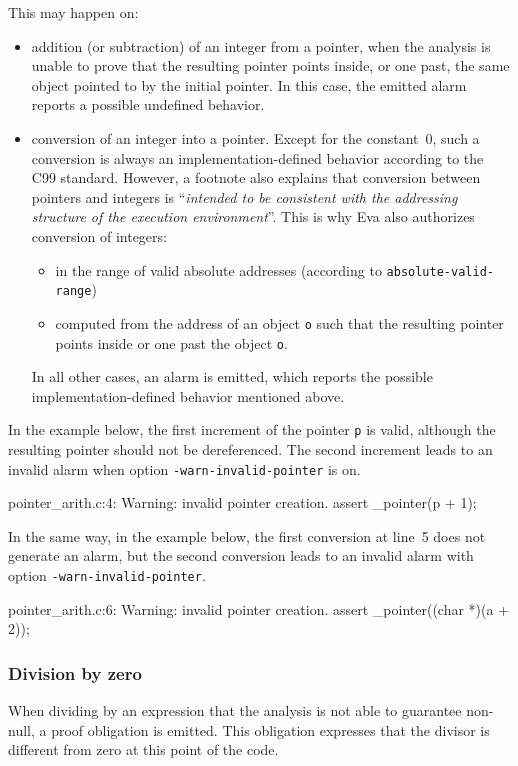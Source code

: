 \documentclass{frama-c-book}
\newcommand{\isoc}{\textsf{C99}}
\begin{document}
This may happen on:
\begin{itemize}
\item addition (or subtraction) of an integer from a pointer, when the analysis
  is unable to prove that the resulting pointer points inside, or one past,
  the same object pointed to by the initial pointer.
  In this case, the emitted alarm reports a possible undefined behavior.
\item conversion of an integer into a pointer. Except for the constant~0,
  such a conversion is always an implementation-defined behavior
  according to the \isoc{} standard. However, a footnote also explains that
  conversion between pointers and integers is ``\emph{intended to
  be consistent with the addressing structure of the execution environment}''.
  This is why Eva also authorizes conversion of integers:
  \begin{itemize}
  \item in the range of valid absolute addresses
    (according to \texttt{absolute-valid-range})
  \item computed from the address of an object \lstinline|o| such that the
    resulting pointer points inside or one past the object \lstinline|o|.
  \end{itemize}
  In all other cases, an alarm is emitted, which reports the possible
  implementation-defined behavior mentioned above.
\end{itemize}

In the example below, the first increment of the pointer \lstinline|p| is valid,
although the resulting pointer should not be dereferenced. The second increment
leads to an invalid alarm when option \lstinline|-warn-invalid-pointer| is on.
\begin{logs}
   pointer_arith.c:4: Warning:
    invalid pointer creation. assert \object_pointer(p + 1);
\end{logs}

In the same way, in the example below, the first conversion at line~5
does not generate an alarm, but the second conversion leads to an invalid alarm
with option \lstinline|-warn-invalid-pointer|.

\begin{logs}
   pointer_arith.c:6: Warning:
    invalid pointer creation. assert \object_pointer((char *)(a + 2));
\end{logs}


\subsubsection{Division by zero}
When dividing by an expression that the analysis
is not able to guarantee non-null, a proof
obligation is emitted. This obligation expresses that the divisor
is different from zero at this point of the code.
\end{document}
